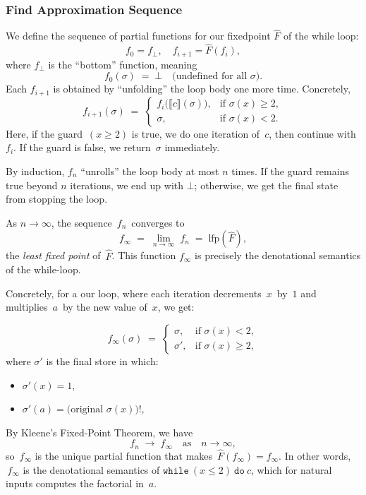 \subsubsection{Find Approximation Sequence}

We define the sequence of partial functions for our fixedpoint $\widehat F$ of the while loop:
\[
f_0 = f_{\bot}, 
\quad
f_{i+1} = \widehat{F}(f_i),
\]
where \(f_{\bot}\) is the ``bottom'' function, meaning
\[
f_0(\sigma) \;=\; \bot
\quad
\text{(undefined for all $\sigma$).}
\]
Each \(f_{i+1}\) is obtained by ``unfolding'' the loop body one more time. Concretely,
\[
f_{i+1}(\sigma) \;=\;
\begin{cases}
  f_i\bigl(\llbracket c\rrbracket (\sigma)\bigr),
  & \text{if } \sigma(x)\ge 2, \\[8pt]
  \sigma,
  & \text{if } \sigma(x)<2.
\end{cases}
\]
\noindent
Here, if the guard \(\,(x \ge 2)\) is true, we do one iteration of \(\,c\), then continue with \(f_i\). 
If the guard is false, we return \(\,\sigma\) immediately.

By induction, \(f_n\) ``unrolls'' the loop body at most \(n\) times. If the guard remains true beyond \(n\) iterations, we end up with \(\bot\); otherwise, we get the final state from stopping the loop.


As \(n \to \infty\), the sequence \(\,f_n\,\) converges to
\[
f_{\infty} \;=\; \lim_{n\to\infty}\; f_n
\;=\;
\mathrm{lfp}(\widehat{F}),
\]
the \emph{least fixed point} of \(\,\widehat{F}\). This function \(f_{\infty}\) is precisely the denotational semantics of the while-loop.

\smallskip
Concretely, for a our loop, where each iteration decrements \(\,x\,\) by \(\,1\) and multiplies \(\,a\,\) by the new value of \(\,x\), we get:

\[
f_{\infty}(\sigma)
\;=\;
\begin{cases}
  \sigma, 
    & \text{if } \sigma(x) < 2, 
\\[6pt]
  \sigma', 
    & \text{if } \sigma(x) \ge 2,
\end{cases}
\]
where \(\sigma'\) is the final store in which:
\begin{itemize}
\item \(\sigma'(x) = 1,\)
\item \(\sigma'(a) = \bigl(\text{original }\sigma(x)\bigr)!\),
\end{itemize}

By Kleene's Fixed-Point Theorem, we have 
\[
f_n \;\longrightarrow\; f_{\infty}
\quad\text{as}\quad n \to \infty,
\]
so 
\(\,f_{\infty}\) is the unique partial function that makes 
\(\,\widehat{F}(f_{\infty}) = f_{\infty}\).
In other words, \(\,f_{\infty}\) is the denotational semantics of 
\(\texttt{while}\ (x \leq 2)\ \texttt{do}\ c\), which for natural inputs 
computes the factorial in \(\,a\).
